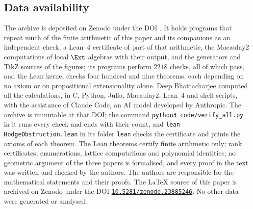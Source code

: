 \subsection*{Data availability}
The archive \cite{BMB26} is deposited on Zenodo under the DOI
\zenodoCodeDOI. It holds programs that repeat much of the finite arithmetic of this paper and its companions \cite{paperI,paperII}
as an independent check, a Lean~4 certificate of part of that arithmetic, the
Macaulay2 computations of local $\Ext$ algebras with their output, and the
generators and TikZ sources of the figures; its programs perform $2218$
checks, all of which pass, and the Lean kernel checks four hundred and nine
theorems, each depending on no axiom or on propositional extensionality
alone. Deep Bhattacharjee computed all the calculations, in C, Python, Julia,
Macaulay2, Lean~4 and shell scripts, with the assistance of Claude Code, an
AI model developed by Anthropic. The archive is immutable at that DOI;
the command \texttt{python3 code/verify\_all.py} in it runs every check and
ends with their count, and \texttt{lean HodgeObstruction.lean} in its folder
\texttt{lean} checks the certificate and prints the axioms of each theorem.
The Lean theorems certify finite arithmetic only: rank certificates,
enumerations, lattice computations and polynomial identities; no geometric
argument of the three papers is formalised, and every proof in the text was
written and checked by the authors. The authors are responsible for the
mathematical statements and their proofs. The \LaTeX{} source of this paper is
archived on Zenodo under the DOI \href{https://doi.org/10.5281/zenodo.23885246}{\texttt{10.5281/zenodo.23885246}}.
No other data were generated or analysed.
